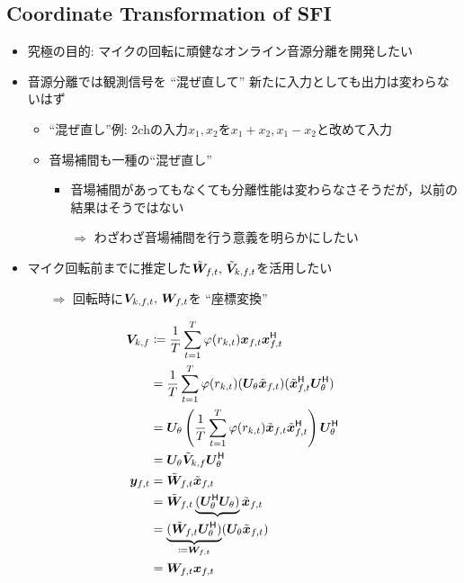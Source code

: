 \documentclass[sip,biber]{now-journal}
\begin{document}
\subsection{Coordinate Transformation of SFI}
\begin{itemize}
  \item 究極の目的: マイクの回転に頑健なオンライン音源分離を開発したい
  \item 音源分離では観測信号を ``混ぜ直して'' 新たに入力としても出力は変わらないはず
    \begin{itemize}
      \item ``混ぜ直し''例: 2chの入力$x_1, x_2$を$x_1+x_2, x_1-x_2$と改めて入力
      \item 音場補間も一種の``混ぜ直し''
        \begin{itemize}
          \item 音場補間があってもなくても分離性能は変わらなさそうだが，以前の結果はそうではない
          \item[$\Rightarrow$] わざわざ音場補間を行う意義を明らかにしたい
        \end{itemize}
    \end{itemize}
  \item マイク回転前までに推定した$\refpos{\Demix} _{\ft},\, \refpos{\cov} _{\src,\ft}$を活用したい
    \begin{itemize}
      \item[$\Rightarrow$] 回転時に$\cov _{\src,\ft},\, \Demix _{\ft}$を ``座標変換''
    \end{itemize}
\end{itemize}
\begin{align}
  {\cov} _{\src,\freq} &\coloneqq \frac{1}{\Tframe} \sum _{\tframe = 1} ^{\Tframe} \weight (\var _{\src,\tframe}) \Obs _{\ft} \Obs _{\ft} ^{\hermite} \\
                       &= \frac{1}{\Tframe} \sum _{\tframe = 1} ^{\Tframe} \weight (\var _{\src,\tframe}) (\rotMat _{\rotSpat} \refpos{\Obs} _{\ft}) (\refpos{\Obs} _{\ft} ^{\hermite} \rotMat _{\rotSpat} ^{\hermite}) \\
                       &= \rotMat _{\rotSpat} \left(\frac{1}{\Tframe} \sum _{\tframe = 1} ^{\Tframe} \weight (\var _{\src,\tframe}) \refpos{\Obs} _{\ft} \refpos{\Obs} _{\ft} ^{\hermite}\right) \rotMat _{\rotSpat} ^{\hermite} \\
                       &= \rotMat _{\rotSpat} \refpos{\cov} _{\src,\freq} \rotMat _{\rotSpat} ^{\hermite}
  \\
  \Est _{\ft} &= \refpos{\Demix} _{\ft} \refpos{\Obs} _{\ft} \\
              &= \refpos{\Demix} _{\ft} \underbrace{(\rotMat _{\rotSpat} ^{\hermite} \rotMat _{\rotSpat})} \refpos{\Obs} _{\ft} \\
              &= \underbrace{(\refpos{\Demix} _{\ft} \rotMat _{\rotSpat} ^{\hermite})}_{\coloneqq \Demix _{\ft}} (\rotMat _{\rotSpat} \refpos{\Obs} _{\ft}) \\
              &= \Demix _{\ft} \Obs _{\ft}
\end{align}
\end{document}
